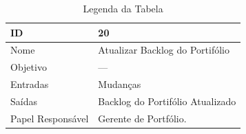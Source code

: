 \begin{table}[H]
  \centering
    \begin{tabular}{| m{5em} | m{10cm} |}
      \hline
      ID       & 20   \\ \hline
      Nome     & Atualizar Backlog do Portifólio  \\ \hline
      Objetivo & ---  \\ \hline
      Entradas & Mudanças \\ \hline
      Saídas   & Backlog do Portifólio Atualizado \\ \hline
      Papel Responsável   & Gerente de Portfólio. \\ \hline
    \end{tabular}
    \caption{Legenda da Tabela}
    \label{tabela:atividade20}
\end{table}

